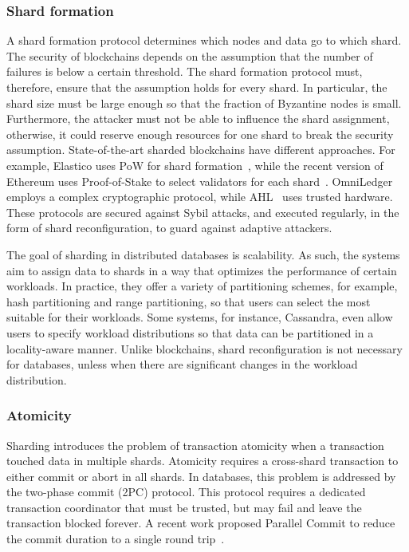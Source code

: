 \subsubsection{Shard formation}
A shard formation protocol determines which nodes and data go to which shard.
The security of blockchains depends on the assumption that the number of
failures is below a certain threshold. The shard formation protocol must,
therefore, ensure that the assumption holds for every shard.
In particular, the shard size must be large enough so that the fraction of
Byzantine nodes is small.
Furthermore, the attacker must not be able to influence the shard assignment,
otherwise, it could reserve enough resources for one shard to break the security
assumption. State-of-the-art sharded blockchains have different approaches. For
example, Elastico uses PoW for shard formation~\cite{luu2016secure}, while
 the recent version of Ethereum uses Proof-of-Stake to select
validators for each shard~\cite{web:eth2}.
OmniLedger~\cite{kokoris2018omniledger} employs a complex cryptographic
protocol, while AHL~\cite{dang2018towards} uses trusted hardware.
These protocols are secured against Sybil attacks, and executed
regularly, in the form of shard reconfiguration, to guard against adaptive
attackers.

The goal of sharding in distributed databases is scalability. As such, the
systems aim to assign data to shards in a way that optimizes the performance of
certain workloads. In practice, they offer a variety of partitioning schemes,
for example, hash partitioning and range partitioning, so that users can select
the most suitable for their workloads. Some systems, for instance,
Cassandra\cite{lakshman2010cassandra}, even allow users to specify workload
distributions so that data can be partitioned in a locality-aware manner. Unlike
blockchains, shard reconfiguration is not necessary for databases, unless when
there are significant changes in the workload distribution.

\subsubsection{Atomicity}
Sharding introduces the problem of transaction atomicity when a transaction
touched data in multiple shards.
Atomicity requires a cross-shard transaction to either commit or abort in all
shards. In databases, this problem is addressed by the two-phase commit (2PC)
protocol. This protocol requires a dedicated transaction coordinator that must
be trusted, but may fail and leave the transaction blocked forever. A recent
work proposed Parallel Commit to reduce the commit duration to a single round
trip~\cite{taft2020cockroachdb}.

